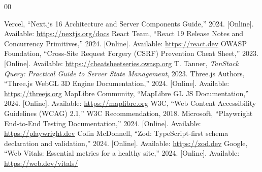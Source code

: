 \documentclass[conference,10pt,a4paper]{IEEEtran}
\begin{document}
\begin{thebibliography}{00}

 Vercel, ``Next.js 16 Architecture and Server Components Guide,'' 2024. [Online]. Available: \url{https://nextjs.org/docs}
 React Team, ``React 19 Release Notes and Concurrency Primitives,'' 2024. [Online]. Available: \url{https://react.dev}
 OWASP Foundation, ``Cross-Site Request Forgery (CSRF) Prevention Cheat Sheet,'' 2023. [Online]. Available: \url{https://cheatsheetseries.owasp.org}
 T. Tanner, \textit{TanStack Query: Practical Guide to Server State Management}, 2023.
 Three.js Authors, ``Three.js WebGL 3D Engine Documentation,'' 2024. [Online]. Available: \url{https://threejs.org}
 MapLibre Community, ``MapLibre GL JS Documentation,'' 2024. [Online]. Available: \url{https://maplibre.org}
 W3C, ``Web Content Accessibility Guidelines (WCAG) 2.1,'' W3C Recommendation, 2018.
 Microsoft, ``Playwright End-to-End Testing Documentation,'' 2024. [Online]. Available: \url{https://playwright.dev}
 Colin McDonnell, ``Zod: TypeScript-first schema declaration and validation,'' 2024. [Online]. Available: \url{https://zod.dev}
 Google, ``Web Vitals: Essential metrics for a healthy site,'' 2024. [Online]. Available: \url{https://web.dev/vitals/}

\end{thebibliography}
\end{document}
